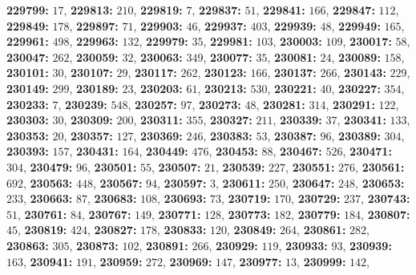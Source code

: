 \textsf{\bfseries 229799:} $17$, \textsf{\bfseries 229813:} $210$, \textsf{\bfseries 229819:} $7$, \textsf{\bfseries 229837:} $51$, \textsf{\bfseries 229841:} $166$, \textsf{\bfseries 229847:} $112$, \textsf{\bfseries 229849:} $178$, \textsf{\bfseries 229897:} $71$, \textsf{\bfseries 229903:} $46$, \textsf{\bfseries 229937:} $403$, \textsf{\bfseries 229939:} $48$, \textsf{\bfseries 229949:} $165$, \textsf{\bfseries 229961:} $498$, \textsf{\bfseries 229963:} $132$, \textsf{\bfseries 229979:} $35$, \textsf{\bfseries 229981:} $103$, \textsf{\bfseries 230003:} $109$, \textsf{\bfseries 230017:} $58$, \textsf{\bfseries 230047:} $262$, \textsf{\bfseries 230059:} $32$, \textsf{\bfseries 230063:} $349$, \textsf{\bfseries 230077:} $35$, \textsf{\bfseries 230081:} $24$, \textsf{\bfseries 230089:} $158$, \textsf{\bfseries 230101:} $30$, \textsf{\bfseries 230107:} $29$, \textsf{\bfseries 230117:} $262$, \textsf{\bfseries 230123:} $166$, \textsf{\bfseries 230137:} $266$, \textsf{\bfseries 230143:} $229$, \textsf{\bfseries 230149:} $299$, \textsf{\bfseries 230189:} $23$, \textsf{\bfseries 230203:} $61$, \textsf{\bfseries 230213:} $530$, \textsf{\bfseries 230221:} $40$, \textsf{\bfseries 230227:} $354$, \textsf{\bfseries 230233:} $7$, \textsf{\bfseries 230239:} $548$, \textsf{\bfseries 230257:} $97$, \textsf{\bfseries 230273:} $48$, \textsf{\bfseries 230281:} $314$, \textsf{\bfseries 230291:} $122$, \textsf{\bfseries 230303:} $30$, \textsf{\bfseries 230309:} $200$, \textsf{\bfseries 230311:} $355$, \textsf{\bfseries 230327:} $211$, \textsf{\bfseries 230339:} $37$, \textsf{\bfseries 230341:} $133$, \textsf{\bfseries 230353:} $20$, \textsf{\bfseries 230357:} $127$, \textsf{\bfseries 230369:} $246$, \textsf{\bfseries 230383:} $53$, \textsf{\bfseries 230387:} $96$, \textsf{\bfseries 230389:} $304$, \textsf{\bfseries 230393:} $157$, \textsf{\bfseries 230431:} $164$, \textsf{\bfseries 230449:} $476$, \textsf{\bfseries 230453:} $88$, \textsf{\bfseries 230467:} $526$, \textsf{\bfseries 230471:} $304$, \textsf{\bfseries 230479:} $96$, \textsf{\bfseries 230501:} $55$, \textsf{\bfseries 230507:} $21$, \textsf{\bfseries 230539:} $227$, \textsf{\bfseries 230551:} $276$, \textsf{\bfseries 230561:} $692$, \textsf{\bfseries 230563:} $448$, \textsf{\bfseries 230567:} $94$, \textsf{\bfseries 230597:} $3$, \textsf{\bfseries 230611:} $250$, \textsf{\bfseries 230647:} $248$, \textsf{\bfseries 230653:} $233$, \textsf{\bfseries 230663:} $87$, \textsf{\bfseries 230683:} $108$, \textsf{\bfseries 230693:} $73$, \textsf{\bfseries 230719:} $170$, \textsf{\bfseries 230729:} $237$, \textsf{\bfseries 230743:} $51$, \textsf{\bfseries 230761:} $84$, \textsf{\bfseries 230767:} $149$, \textsf{\bfseries 230771:} $128$, \textsf{\bfseries 230773:} $182$, \textsf{\bfseries 230779:} $184$, \textsf{\bfseries 230807:} $45$, \textsf{\bfseries 230819:} $424$, \textsf{\bfseries 230827:} $178$, \textsf{\bfseries 230833:} $120$, \textsf{\bfseries 230849:} $264$, \textsf{\bfseries 230861:} $282$, \textsf{\bfseries 230863:} $305$, \textsf{\bfseries 230873:} $102$, \textsf{\bfseries 230891:} $266$, \textsf{\bfseries 230929:} $119$, \textsf{\bfseries 230933:} $93$, \textsf{\bfseries 230939:} $163$, \textsf{\bfseries 230941:} $191$, \textsf{\bfseries 230959:} $272$, \textsf{\bfseries 230969:} $147$, \textsf{\bfseries 230977:} $13$, \textsf{\bfseries 230999:} $142$, 
